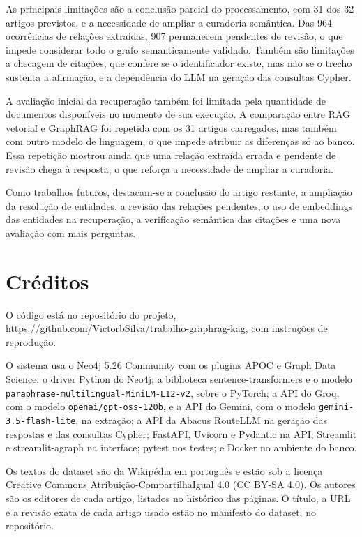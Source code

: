 \documentclass[12pt]{article}
\begin{document}
As principais limitações são a conclusão parcial do
processamento, com 31 dos 32 artigos previstos, e a
necessidade de ampliar a curadoria semântica. Das 964
ocorrências de relações extraídas, 907 permanecem
pendentes de revisão, o que impede considerar todo o
grafo semanticamente validado. Também são limitações a
checagem de citações, que confere se o identificador
existe, mas não se o trecho sustenta a afirmação, e a
dependência do LLM na geração das consultas Cypher.

A avaliação inicial da recuperação também foi limitada
pela quantidade de documentos disponíveis no momento
de sua execução. A comparação entre RAG vetorial e
GraphRAG foi repetida com os 31 artigos carregados, mas
também com outro modelo de linguagem, o que impede
atribuir as diferenças só ao banco. Essa repetição
mostrou ainda que uma relação extraída errada e pendente
de revisão chega à resposta, o que reforça a necessidade
de ampliar a curadoria.

Como trabalhos futuros, destacam-se a conclusão do
artigo restante, a ampliação da resolução de entidades,
a revisão das relações pendentes, o uso de embeddings das
entidades na recuperação, a verificação semântica das
citações e uma nova avaliação com mais perguntas.

\section{Créditos}

O código está no repositório do projeto,
\url{https://github.com/VictorbSilva/trabalho-graphrag-kag}, com instruções de reprodução.

O sistema usa o Neo4j 5.26 Community com os plugins APOC e Graph Data Science; o driver
Python do Neo4j; a biblioteca sentence-transformers e o modelo
\texttt{paraphrase-multilingual-MiniLM-L12-v2}, sobre o PyTorch; a API do Groq, com o
modelo \texttt{openai/gpt-oss-120b}, e a API do Gemini, com o modelo
\texttt{gemini-3.5-flash-lite}, na extração; a API da Abacus RouteLLM na geração das
respostas e das consultas Cypher; FastAPI, Uvicorn e Pydantic na API; Streamlit e
streamlit-agraph na interface; pytest nos testes; e Docker no ambiente do banco.

Os textos do dataset são da Wikipédia em português e estão sob a licença Creative Commons
Atribuição-CompartilhaIgual 4.0 (CC BY-SA 4.0). Os autores são os editores de cada artigo,
listados no histórico das páginas. O título, a URL e a revisão exata de cada artigo usado
estão no manifesto do dataset, no repositório.


\end{document}
